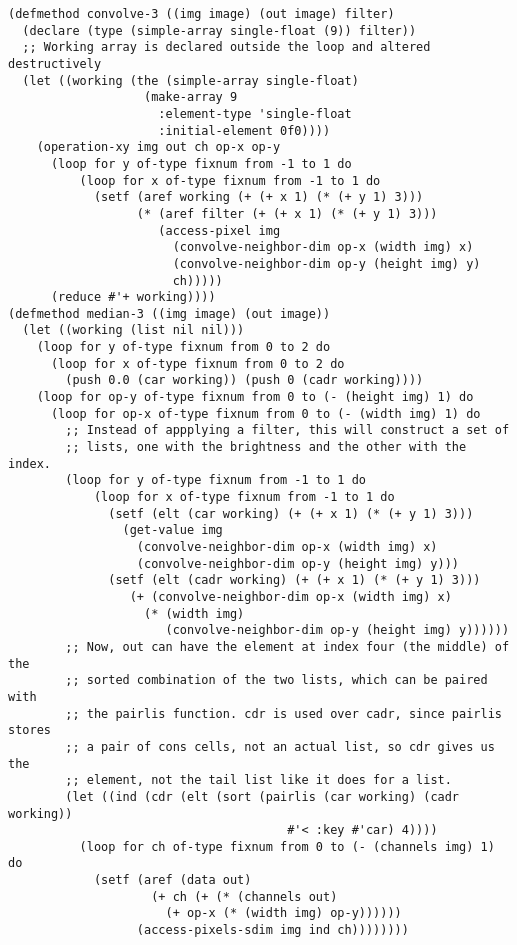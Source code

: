 \documentclass[11pt]{report}
\begin{document}
\begin{lstlisting}
(defmethod convolve-3 ((img image) (out image) filter)
  (declare (type (simple-array single-float (9)) filter))
  ;; Working array is declared outside the loop and altered destructively
  (let ((working (the (simple-array single-float)
                   (make-array 9
                     :element-type 'single-float
                     :initial-element 0f0))))
    (operation-xy img out ch op-x op-y
      (loop for y of-type fixnum from -1 to 1 do
          (loop for x of-type fixnum from -1 to 1 do
            (setf (aref working (+ (+ x 1) (* (+ y 1) 3)))
                  (* (aref filter (+ (+ x 1) (* (+ y 1) 3)))
                     (access-pixel img
                       (convolve-neighbor-dim op-x (width img) x)
                       (convolve-neighbor-dim op-y (height img) y)
                       ch)))))
      (reduce #'+ working))))
(defmethod median-3 ((img image) (out image))
  (let ((working (list nil nil)))
    (loop for y of-type fixnum from 0 to 2 do
      (loop for x of-type fixnum from 0 to 2 do
        (push 0.0 (car working)) (push 0 (cadr working))))
    (loop for op-y of-type fixnum from 0 to (- (height img) 1) do
      (loop for op-x of-type fixnum from 0 to (- (width img) 1) do
        ;; Instead of appplying a filter, this will construct a set of
        ;; lists, one with the brightness and the other with the index.
        (loop for y of-type fixnum from -1 to 1 do
            (loop for x of-type fixnum from -1 to 1 do
              (setf (elt (car working) (+ (+ x 1) (* (+ y 1) 3)))
                (get-value img
                  (convolve-neighbor-dim op-x (width img) x)
                  (convolve-neighbor-dim op-y (height img) y)))
              (setf (elt (cadr working) (+ (+ x 1) (* (+ y 1) 3)))
                 (+ (convolve-neighbor-dim op-x (width img) x)
                   (* (width img)
                      (convolve-neighbor-dim op-y (height img) y))))))
        ;; Now, out can have the element at index four (the middle) of the
        ;; sorted combination of the two lists, which can be paired with
        ;; the pairlis function. cdr is used over cadr, since pairlis stores
        ;; a pair of cons cells, not an actual list, so cdr gives us the
        ;; element, not the tail list like it does for a list.
        (let ((ind (cdr (elt (sort (pairlis (car working) (cadr working))
                                       #'< :key #'car) 4))))
          (loop for ch of-type fixnum from 0 to (- (channels img) 1) do
            (setf (aref (data out)
                    (+ ch (+ (* (channels out)
                      (+ op-x (* (width img) op-y))))))
                  (access-pixels-sdim img ind ch))))))))
\end{lstlisting}
\end{document}
